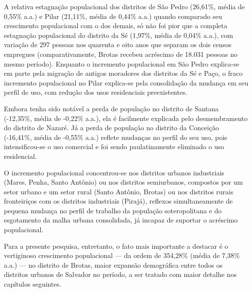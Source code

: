 A relativa estagnação populacional dos distritos de São Pedro (26,61\%, média de 0,55\% a.a.) e Pilar (21,11\%, média de 0,44\% a.a.) quando comparado seu crescimento populacional com o dos demais, só não foi pior que a completa estagnação populacional do distrito da Sé (1,97\%, média de 0,04\% a.a.), com variação de 297 pessoas nos quarenta e oito anos que separam os dois censos empregues (comparativamente, Brotas recebeu acréscimo de 18.031 pessoas no mesmo período). Enquanto o incremento populacional em São Pedro explica-se em parte pela migração de antigos moradores dos distritos da Sé e Paço, o fraco incremento populacional no Pilar explica-se pela consolidação da mudança em seu perfil de uso, com redução dos usos residenciais preexistentes.

Embora tenha sido notável a perda de população no distrito de Santana (-12,35\%, média de -0,22\% a.a.), ela é facilmente explicada pelo desmembramento do distrito de Nazaré. Já a perda de população no distrito da Conceição (-16,41\%, média de -0,55\% a.a.) reflete mudanças no perfil do seu uso, pois intensificou-se o uso comercial e foi sendo paulatinamente eliminado o uso residencial.

O incremento populacional concentrou-se nos distritos urbanos industriais (Mares, Penha, Santo Antônio) ou nos distritos semiurbanos, compostos por um setor urbano e um setor rural (Santo Antônio, Brotas) ou nos distritos rurais fronteiriços com os distritos industriais (Pirajá), reflexos simultaneamente de pequena mudança no perfil de trabalho da população soteropolitana e do esgotamento da malha urbana consolidada, já incapaz de suportar o acréscimo populacional.

Para a presente pesquisa, entretanto, o fato mais importante a destacar é o vertiginoso crescimento populacional --- da ordem de 354,28\% (média de 7,38\% a.a.) --- no distrito de Brotas, maior expansão demográfica entre todos os distritos urbanos de Salvador no período, a ser tratado com maior detalhe nos capítulos seguintes.

